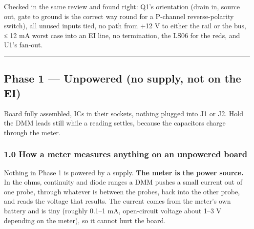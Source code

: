 \documentclass[
  10pt,
  twoside]{article}
\begin{document}
Checked in the same review and found right: Q1's orientation
(drain in, source out, gate to ground is the correct way
round for a P-channel reverse-polarity switch), all unused
inputs tied, no path from +12 V to either the rail or the
bus, ≤ 12 mA worst case into an EI line, no termination, the
LS06 for the reds, and U1's fan-out.

\begin{center}\rule{0.5\linewidth}{0.5pt}\end{center}

\clearpage
\hypertarget{phase-1-unpowered-no-supply-not-on-the-ei}{%
\subsection{Phase 1 --- Unpowered (no supply, not on the
EI)}\label{phase-1-unpowered-no-supply-not-on-the-ei}}

Board fully assembled, ICs in their sockets, nothing plugged
into J1 or J2. Hold the DMM leads still while a reading
settles, because the capacitors charge through the meter.

\hypertarget{how-a-meter-measures-anything-on-an-unpowered-board}{%
\subsubsection{1.0 How a meter measures anything on an
unpowered
board}\label{how-a-meter-measures-anything-on-an-unpowered-board}}

\textcolor[HTML]{0040A0}{Nothing in Phase 1 is powered by a
supply. \textbf{The meter is the power source.} In the ohms,
continuity and diode ranges a DMM pushes a small current out
of one probe, through whatever is between the probes, back
into the other probe, and reads the voltage that results.
The current comes from the meter's own battery and is tiny
(roughly 0.1--1 mA, open-circuit voltage about 1--3 V
depending on the meter), so it cannot hurt the board.}
\end{document}
